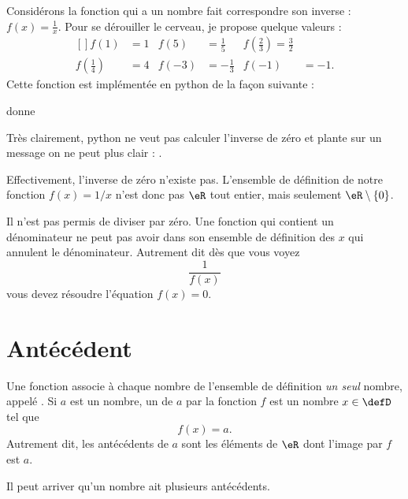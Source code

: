 \begin{example}
    Considérons la fonction qui a un nombre fait correspondre son inverse : \( f(x)=\frac{1}{ x }\). Pour se dérouiller le cerveau, je propose quelque valeurs :
    \begin{equation}
        \begin{aligned}[]
            f(1)&=1&f(5)&=\frac{1}{ 5 }&f(\frac{ 2 }{ 3 })=\frac{ 3 }{ 2 }\\
            f(\frac{ 1 }{ 4 })&=4&f(-3)&=-\frac{1}{ 3 }&f(-1)&=-1.
        \end{aligned}
    \end{equation}
    Cette fonction est implémentée en python de la façon suivante :



donne



Très clairement, python ne veut pas calculer l'inverse de zéro et plante sur un message on ne peut plus clair : .

Effectivement, l'inverse de zéro n'existe pas. L'ensemble de définition de notre fonction \( f(x)=1/x\) n'est donc pas \( \eR\) tout entier, mais seulement \( \eR\setminus\{ 0 \}\).

\end{example}

\begin{Aretenir}        \label{ArtJgipNt}
    Il n'est pas permis de diviser par zéro. Une fonction qui contient un dénominateur ne peut pas avoir dans son ensemble de définition des \( x\) qui annulent le dénominateur. Autrement dit dès que vous voyez
    \begin{equation}
        \frac{1}{ f(x) }
    \end{equation}
    vous devez résoudre l'équation \( f(x)=0\).
\end{Aretenir}

\section{Antécédent}

\begin{Aretenir}
Une fonction associe à chaque nombre de l'ensemble de définition \emph{un seul} nombre, appelé . Si \( a\) est un nombre, un  de \( a\) par la fonction \( f\) est un nombre \( x\in\defD\) tel que 
\begin{equation}
    f(x)=a.
\end{equation}
Autrement dit, les antécédents de \( a\) sont les éléments de \( \eR\) dont l'image par \( f\) est \( a\).

Il peut arriver qu'un nombre ait plusieurs antécédents.
\end{Aretenir}


